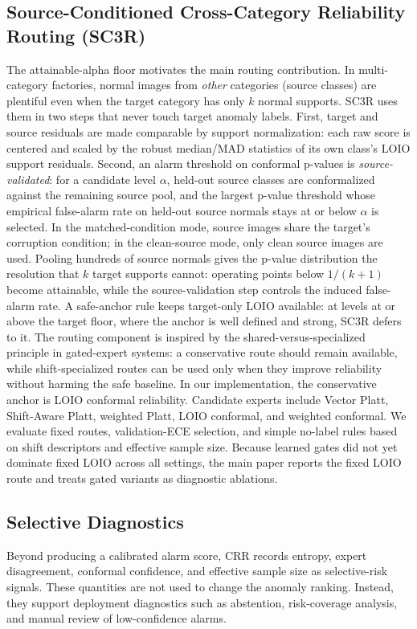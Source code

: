 \subsection{Source-Conditioned Cross-Category Reliability Routing (SC3R)}
The attainable-alpha floor motivates the main routing contribution. In multi-category factories, normal images from \emph{other} categories (source classes) are plentiful even when the target category has only $k$ normal supports. SC3R uses them in two steps that never touch target anomaly labels. First, target and source residuals are made comparable by support normalization: each raw score is centered and scaled by the robust median/MAD statistics of its own class's LOIO support residuals. Second, an alarm threshold on conformal p-values is \emph{source-validated}: for a candidate level $\alpha$, held-out source classes are conformalized against the remaining source pool, and the largest p-value threshold whose empirical false-alarm rate on held-out source normals stays at or below $\alpha$ is selected. In the matched-condition mode, source images share the target's corruption condition; in the clean-source mode, only clean source images are used. Pooling hundreds of source normals gives the p-value distribution the resolution that $k$ target supports cannot: operating points below $1/(k{+}1)$ become attainable, while the source-validation step controls the induced false-alarm rate. A safe-anchor rule keeps target-only LOIO available: at levels at or above the target floor, where the anchor is well defined and strong, SC3R defers to it.
The routing component is inspired by the shared-versus-specialized principle in gated-expert systems: a conservative route should remain available, while shift-specialized routes can be used only when they improve reliability without harming the safe baseline. In our implementation, the conservative anchor is LOIO conformal reliability. Candidate experts include Vector Platt, Shift-Aware Platt, weighted Platt, LOIO conformal, and weighted conformal. We evaluate fixed routes, validation-ECE selection, and simple no-label rules based on shift descriptors and effective sample size. Because learned gates did not yet dominate fixed LOIO across all settings, the main paper reports the fixed LOIO route and treats gated variants as diagnostic ablations.

\subsection{Selective Diagnostics}
Beyond producing a calibrated alarm score, CRR records entropy, expert disagreement, conformal confidence, and effective sample size as selective-risk signals. These quantities are not used to change the anomaly ranking. Instead, they support deployment diagnostics such as abstention, risk-coverage analysis, and manual review of low-confidence alarms.
